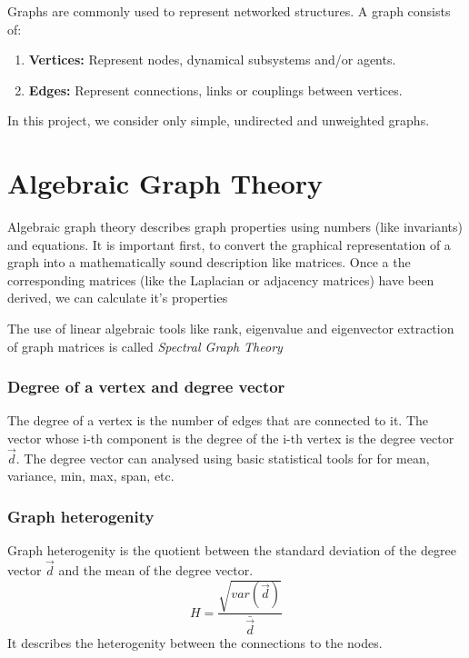 \documentclass[a4paper,twoside, openright,12pt]{report}
\begin{document}
Graphs are commonly used to represent networked structures. A graph consists of: 
\begin{enumerate}
\item \textbf{Vertices:} Represent nodes, dynamical subsystems and/or agents.
\item \textbf{Edges:} Represent connections, links or couplings between vertices.
\end{enumerate}

In this project, we consider only simple, undirected and unweighted graphs. 

\section{Algebraic Graph Theory}

Algebraic graph theory describes graph properties using numbers (like invariants) and equations.
It is important first, to convert the graphical representation of a graph into a mathematically sound description like
matrices. Once a the corresponding matrices (like the Laplacian or adjacency matrices) have been derived, we can calculate it's properties \cite{NCS} 

The use of linear algebraic tools like rank, eigenvalue and eigenvector extraction of graph matrices is called \textit{Spectral Graph Theory} 

\subsubsection{Degree of a vertex and degree vector}
The degree of a vertex is the number of edges that are connected to it.
The vector whose i-th component is the degree of the i-th vertex is the degree vector $\vec{d}$. 
The degree vector can analysed using basic statistical tools for for mean, variance, min, max, span, etc.

\subsubsection{Graph heterogenity}
Graph heterogenity is the quotient between the standard deviation of the degree vector $\vec{d}$ and the mean of the degree vector.
\begin{equation}
 H = \frac{\sqrt{ var(\vec{d}) }}{\bar{\vec{d}}} 
\end{equation}
It describes the heterogenity between the connections to the nodes.   
\end{document}
